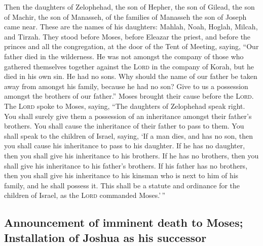  Then the daughters of Zelophehad, the son of Hepher, the
son of Gilead, the son of Machir, the son of Manasseh, of the families
of Manasseh the son of Joseph came near. These are the names of his
daughters: Mahlah, Noah, Hoglah, Milcah, and Tirzah.  They
stood before Moses, before Eleazar the priest, and before the princes
and all the congregation, at the door of the Tent of Meeting, saying,
 ``Our father died in the wilderness. He was not amongst
the company of those who gathered themselves together against the
\textsc{Lord} in the company of Korah, but he died in his own sin. He
had no sons.  Why should the name of our father be taken
away from amongst his family, because he had no son? Give to us a
possession amongst the brothers of our father.''  Moses
brought their cause before the \textsc{Lord}.  The
\textsc{Lord} spoke to Moses, saying,  ``The daughters of
Zelophehad speak right. You shall surely give them a possession of an
inheritance amongst their father's brothers. You shall cause the
inheritance of their father to pass to them.  You shall
speak to the children of Israel, saying, `If a man dies, and has no son,
then you shall cause his inheritance to pass to his daughter.
 If he has no daughter, then you shall give his
inheritance to his brothers.  If he has no brothers, then
you shall give his inheritance to his father's brothers. 
If his father has no brothers, then you shall give his inheritance to
his kinsman who is next to him of his family, and he shall possess it.
This shall be a statute and ordinance for the children of Israel, as the
\textsc{Lord} commanded Moses.'\,''

\hypertarget{announcement-of-imminent-death-to-moses-installation-of-joshua-as-his-successor}{%
\subsection{Announcement of imminent death to Moses; Installation of
Joshua as his
successor}\label{announcement-of-imminent-death-to-moses-installation-of-joshua-as-his-successor}}

